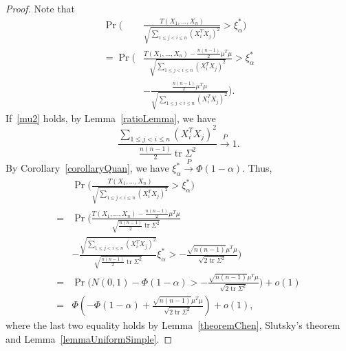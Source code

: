 \documentclass[review]{elsarticle}
\DeclareMathOperator{\mytr}{tr}
\theoremstyle{plain}
\theoremstyle{definition}
\theoremstyle{remark}
\begin{document}
\begin{proof} 
    Note that
    \begin{align}
        \Pr\Big(&\frac{T( X_1,\ldots, X_n)}{\sqrt{\sum_{1\leq j<i\leq n}{(X_i^T X_j)}^2}}>\xi_{\alpha}^* \Big)\nonumber\\
            =
            \Pr\bigg(&\frac{T( X_1,\ldots, X_n)-\frac{n(n-1)}{2}\mu^T\mu}{\sqrt{\sum_{1\leq j<i\leq n}{(X_i^T X_j)}^2}}>\xi_{\alpha}^*\nonumber\\
            &
            -\frac{\frac{n(n-1)}{2}\mu^T\mu}{\sqrt{\sum_{1\leq j<i\leq n}{(X_i^T X_j)}^2}} \bigg).\nonumber
    \end{align}
    If~\eqref{mu2} holds, by Lemma~\ref{ratioLemma}, we have
    \begin{equation*}
    \frac{\sum_{1\leq j< i\leq n}(X_i^T X_j)^2}{\frac{n(n-1)}{2}\mytr \Sigma^2}\xrightarrow{P}1.
    \end{equation*}
    By Corollary~\ref{corollaryQuan}, we have $\xi_{\alpha}^*\xrightarrow{P} \Phi(1-\alpha)$.
Thus,
    \begin{equation*}
        \begin{aligned}
            &\Pr\Big(\frac{T( X_1,\ldots, X_n)}{\sqrt{\sum_{1\leq j<i\leq n}{(X_i^T X_j)}^2}}>\xi_{\alpha}^* \Big)\\
            =&
            \Pr\Big(\frac{T( X_1,\ldots, X_n)-\frac{n(n-1)}{2}\mu^T\mu}{\sqrt{\frac{n(n-1)}{2}\mytr \Sigma^2}}\\
            &-
            \frac{\sqrt{\sum_{1\leq j<i\leq n}{(X_i^T X_j)}^2}}{\sqrt{\frac{n(n-1)}{2}\mytr \Sigma^2}}\xi_{\alpha}^*>
            -\frac{\sqrt{n(n-1)}\mu^T\mu}{\sqrt{2\mytr \Sigma^2}} \Big)\\
            =&
            \Pr\Big(N(0,1)-\Phi(1-\alpha)>-\frac{\sqrt{n(n-1)}\mu^T\mu}{\sqrt{2\mytr \Sigma^2}}\Big)+o(1)\\
            =&
            \Phi(-\Phi(1-\alpha)+\frac{\sqrt{n(n-1)}\mu^T\mu}{\sqrt{2\mytr \Sigma^2}})+o(1),
        \end{aligned}
    \end{equation*}
    where the last two equality holds by Lemma~\ref{theoremChen}, Slutsky's theorem and Lemma~\ref{lemmaUniformSimple}.


\end{proof}
\end{document}
